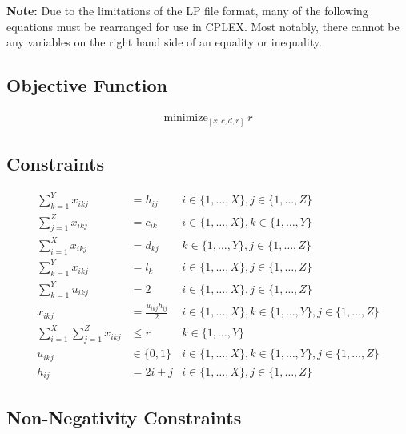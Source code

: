 \documentclass[12pt]{article} %
\begin{document}
\noindent \textbf{Note:} Due to the limitations of the LP file format, many of the following equations must be rearranged for use in CPLEX. Most notably, there cannot be any variables on the right hand side of an equality or inequality.

\newpage

\subsection{Objective Function}

\begin{align}
\label{eq:obj_func_def}
\text{minimize}_{[x, c, d, r]}\ r
\end{align}

\subsection{Constraints}

\begin{align}
\label{eq:demand_flow_constraint}
\sum_{k = 1}^{Y} x_{ikj} &= h_{ij} & i \in \{1, \ldots, X\}, j \in \{1, \ldots, Z\} \\[1em]
\label{eq:source_capacity_constraint}
\sum_{j = 1}^{Z} x_{ikj} &= c_{ik} & i \in \{1, \ldots, X\}, k \in \{1, \ldots, Y\} \\[1em]
\label{eq:dest_capacity_constraint}
\sum_{i = 1}^{X} x_{ikj} &= d_{kj} & k \in \{1, \ldots, Y\}, j \in \{1, \ldots, Z\} \\[1em]
\label{eq:transit_link_capacity_constraint}
\sum_{k = 1}^{Y} x_{ikj} &= l_k & i \in \{1, \ldots, X\}, j \in \{1, \ldots, Z\} \\[1em]
\label{eq:binary_select_constraint}
\sum_{k = 1}^{Y} u_{ikj} &= 2 & i \in \{1, \ldots, X\}, j \in \{1, \ldots, Z\} \\[1em]
\label{eq:binary_constraint}
x_{ikj} &= \frac{u_{ikj}h_{ij}}{2} & i \in \{1, \ldots, X\}, k \in \{1, \ldots, Y\}, j \in \{1, \ldots, Z\} \\[1em]
\label{eq:decision_var_constraint}
\sum_{i = 1}^{X} \sum_{j = 1}^{Z} x_{ikj} &\leq r & k \in \{1, \ldots, Y\} \\[1em]
\label{eq:binary_definition}
u_{ikj} &\in \{0, 1\} & i \in \{1, \ldots, X\}, k \in \{1, \ldots, Y\}, j \in \{1, \ldots, Z\} \\[1em]
\label{eq:demand_definition}
h_{ij} &= 2i + j & i \in \{1, \ldots, X\}, j \in \{1, \ldots, Z\}
\end{align}

\subsection{Non-Negativity Constraints}
\end{document}

